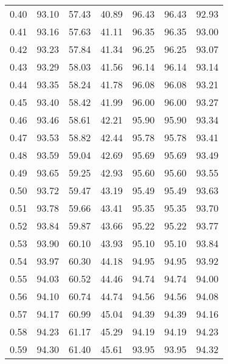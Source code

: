 \begin{tabular}{|c|c|c|c|c|c|c|}
      0.40 &     93.10 &     57.43 &      40.89 &   96.43 &      96.43 &         92.93 \\
      0.41 &     93.16 &     57.63 &      41.11 &   96.35 &      96.35 &         93.00 \\
      0.42 &     93.23 &     57.84 &      41.34 &   96.25 &      96.25 &         93.07 \\
      0.43 &     93.29 &     58.03 &      41.56 &   96.14 &      96.14 &         93.14 \\
      0.44 &     93.35 &     58.24 &      41.78 &   96.08 &      96.08 &         93.21 \\
      0.45 &     93.40 &     58.42 &      41.99 &   96.00 &      96.00 &         93.27 \\
      0.46 &     93.46 &     58.61 &      42.21 &   95.90 &      95.90 &         93.34 \\
      0.47 &     93.53 &     58.82 &      42.44 &   95.78 &      95.78 &         93.41 \\
      0.48 &     93.59 &     59.04 &      42.69 &   95.69 &      95.69 &         93.49 \\
      0.49 &     93.65 &     59.25 &      42.93 &   95.60 &      95.60 &         93.55 \\
      0.50 &     93.72 &     59.47 &      43.19 &   95.49 &      95.49 &         93.63 \\
      0.51 &     93.78 &     59.66 &      43.41 &   95.35 &      95.35 &         93.70 \\
      0.52 &     93.84 &     59.87 &      43.66 &   95.22 &      95.22 &         93.77 \\
      0.53 &     93.90 &     60.10 &      43.93 &   95.10 &      95.10 &         93.84 \\
      0.54 &     93.97 &     60.30 &      44.18 &   94.95 &      94.95 &         93.92 \\
      0.55 &     94.03 &     60.52 &      44.46 &   94.74 &      94.74 &         94.00 \\
      0.56 &     94.10 &     60.74 &      44.74 &   94.56 &      94.56 &         94.08 \\
      0.57 &     94.17 &     60.99 &      45.04 &   94.39 &      94.39 &         94.16 \\
      0.58 &     94.23 &     61.17 &      45.29 &   94.19 &      94.19 &         94.23 \\
      0.59 &     94.30 &     61.40 &      45.61 &   93.95 &      93.95 &         94.32 \\

\end{tabular}
